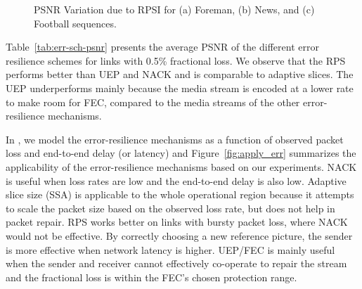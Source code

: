 \begin{figure}[!t]
  \centerline{
}
\caption{PSNR Variation due to RPSI for (a) Foreman, (b) News, and (c)
Football sequences.}
\label{fig:rpsi_sim}
\end{figure}

Table~\ref{tab:err-sch-psnr} presents the average PSNR of the different error
resilience schemes for links with 0.5\% fractional loss. We observe that the
RPS performs better than UEP and NACK and is comparable to adaptive slices.
The UEP underperforms mainly because the media stream is encoded at a lower
rate to make room for FEC, compared to the media streams of the other
error-resilience mechanisms.

\begin{table}
\caption{Comparing the performance of different error-resilience
schemes on three different types of YUV sequences~\cite{YUV_seq}. The link
loss rate is 0.5\% at each 3G link.}
\label{tab:err-sch-psnr}
\end{table}

In , we model the error-resilience mechanisms as a function of
observed packet loss and end-to-end delay (or latency) and
Figure~\ref{fig:apply_err} summarizes the applicability of the
error-resilience mechanisms based on our experiments. NACK is useful when loss
rates are low and the end-to-end delay is also low. Adaptive slice size (SSA)
is applicable to the whole operational region because it attempts to scale the
packet size based on the observed loss rate, but does not help in packet
repair. RPS works better on links with bursty packet loss, where NACK would
not be effective. By correctly choosing a new reference picture, the sender is
more effective when network latency is higher. UEP/FEC is mainly useful when
the sender and receiver cannot effectively co-operate to repair the stream and
the fractional loss is within the FEC's chosen protection range.

